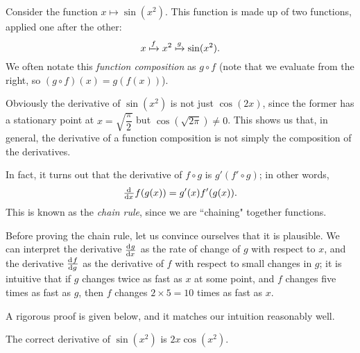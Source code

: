 


\begin{center}
\end{center}
Consider the function $ x \mapsto \sin (x^2) $. This function is made up of two
functions, applied one after the other:
\begin{displaymath}
  x \xmapsto{f} x^2 \xmapsto{g} \sin(x^2).
\end{displaymath}
We often notate this \textit{function composition} as $ g \circ f $ (note that we
evaluate from the right, so $ (g \circ f)(x) = g(f(x)) $).

Obviously the derivative of $ \sin(x^2) $ is not just $ \cos(2x) $, since the former
has a stationary point at $ x = \sqrt{\dfrac{\pi}{2}} $ but $ \cos(\sqrt{2\pi}) \neq 0 $. This
shows us that, in general, the derivative of a function composition is not simply the composition
of the derivatives.

In fact, it turns out that the derivative of $ f \circ g $ is $ g' (f' \circ g) $; in other words,
\begin{displaymath}
  \od{}{x} f(g(x)) = g'(x) f'(g(x)).
\end{displaymath}
This is known as the \textit{chain rule}, since we are ``chaining" together functions.

Before proving the chain rule, let us convince ourselves that it is plausible. We can interpret the
derivative $ \od{g}{x} $ as the rate of change of $ g $ with respect to $ x $, and the derivative $ \od{f}{g} $
as the derivative of $ f $ with respect to small changes in $ g $; it is intuitive that if $ g $ changes
twice as fast as $ x $ at some point, and $ f $ changes five times as fast as $ g $, then $ f $ changes $ 2 \times 5 = 10 $
times as fast as $ x $.

A rigorous proof is given below, and it matches our intuition reasonably well.

\begin{ex}
  The correct derivative of $ \sin(x^2) $ is $ 2x \cos(x^2) $.
\end{ex}

